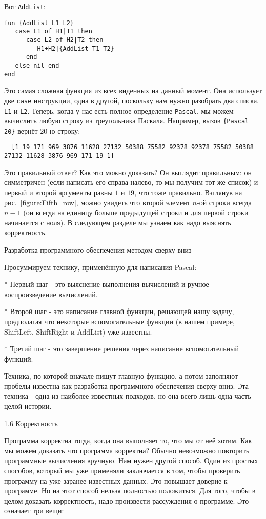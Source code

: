 Вот \lstinline|AddList|:

\begin{lstlisting}
fun {AddList L1 L2}
   case L1 of H1|T1 then
      case L2 of H2|T2 then
         H1+H2|{AddList T1 T2}
      end
   else nil end
end
\end{lstlisting}

Это самая сложная функция из всех виденных на данный момент. Она использует две \lstinline|case| инструкции, одна в другой, поскольку нам нужно разобрать два списка, \lstinline|L1| и \lstinline|L2|. Теперь, когда у нас есть полное определение \lstinline|Pascal|, мы можем вычислить любую строку из треугольника Паскаля. Например, вызов \lstinline|{Pascal 20}| вернёт 20-ю строку:

\begin{lstlisting}
  [1 19 171 969 3876 11628 27132 50388 75582 92378 92378 75582 50388 27132 11628 3876 969 171 19 1]
\end{lstlisting}

Это правильный ответ? Как это можно доказать? Он выглядит правильным: он симметричен (если написать его справа налево, то мы получим тот же список) и первый и второй аргументы равны $1$ и $19$, что тоже правильно. Взглянув на рис.~\ref{figure:Fifth_row}, можно увидеть что второй элемент $n$-ой строки всегда $n-1$ (он всегда на единицу больше предыдущей строки и для первой строки начинается с ноля). В следующем разделе мы узнаем как надо выяснять корректность.

Разработка программного обеспечения методом сверху-вниз

Просуммируем технику, применённую для написания Pascal:

* Первый шаг - это выяснение выполнения вычислений и ручное воспроизведение вычислений.

* Второй шаг - это написание главной функции, решающей нашу задачу, предполагая что некоторые вспомогательные функции (в нашем примере, ShiftLeft, ShiftRight и AddList) уже известны.

* Третий шаг - это завершение решения через написание вспомогательный функций.

Техника, по которой вначале пишут главную функцию, а потом заполняют пробелы известна как разработка программного обеспечения сверху-вниз. Эта техника - одна из наиболее известных подходов, но она всего лишь одна часть целой истории.

1.6 Корректность

Программа корректна тогда, когда она выполняет то, что мы от неё хотим. Как мы можем доказать что программа корректна? Обычно невозможно повторить программные вычисления вручную. Нам нужен другой способ. Один из простых способов, который мы уже применяли заключается в том, чтобы проверить программу на уже заранее известных данных. Это повышает доверие к программе. Но на этот способ нельзя полностью положиться. Для того, чтобы в целом доказать корректность, надо произвести рассуждения о программе. Это означает три вещи:

